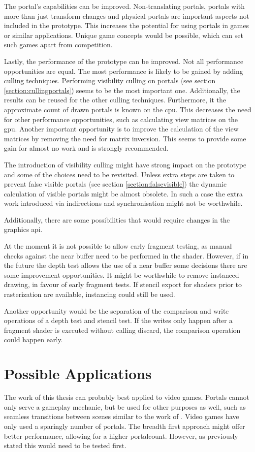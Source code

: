 The portal's capabilities can be improved. Non-translating portals, portals with more than just transform changes and physical portals are important aspects not included in the prototype. This increases the potential for using portals in games or similar applications. Unique game concepts would be possible, which can set such games apart from competition.

Lastly, the performance of the prototype can be improved. Not all performance opportunities are equal. The most performance is likely to be gained by adding culling techniques. Performing visibility culling on portals (see section \ref{section:cullingportals}) seems to be the most important one. Additionally, the results can be reused for the other culling techniques. Furthermore, it the approximate count of drawn portals is known on the \gls{cpu}. This decreases the need for other performance opportunities, such as calculating view matrices on the \gls{gpu}. Another important opportunity is to improve the calculation of the view matrices by removing the need for matrix inversion. This seems to provide some gain for almost no work and is strongly recommended.

The introduction of visibility culling might have strong impact on the prototype and some of the choices need to be revisited. Unless extra steps are taken to prevent false visible portals (see section \ref{section:falsevisible}) the dynamic calculation of visible portals might be almost obsolete. In such a case the extra work introduced via indirections and synchronisation might not be worthwhile.

Additionally, there are some possibilities that would require changes in the graphics \gls{api}.

At the moment it is not possible to allow early fragment testing, as manual checks against the near buffer need to be performed in the shader. However, if in the future the depth test allows the use of a near buffer some decisions there are some improvement opportunities. It might be worthwhile to remove instanced drawing, in favour of early fragment tests. If stencil export for shaders prior to rasterization are available, instancing could still be used.

Another opportunity would be the separation of the comparison and write operations of a depth test and stencil test. If the writes only happen after a fragment shader is executed without calling discard, the comparison operation could happen early.

\section{Possible Applications}
The work of this thesis can probably best applied to video games. Portals cannot only serve a gameplay mechanic, but be used for other purposes as well, such as seamless transitions between scenes similar to the work of \textcite{schmalstieg:1999:sewing}. Video games have only used a sparingly number of portals. The breadth first approach might offer better performance, allowing for a higher \gls{portalcount}. However, as previously stated this would need to be tested first.

